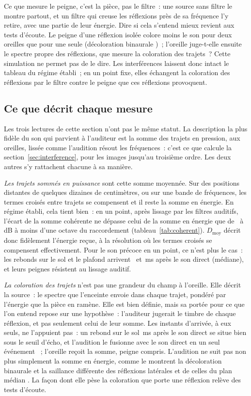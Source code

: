 \documentclass[11pt,a4paper]{article}
\begin{document}
Ce que mesure le peigne, c'est la pièce, pas le filtre~: une source sans filtre le montre partout, et un
filtre qui creuse les réflexions près de sa fréquence l'y retire, avec une partie de leur énergie.
Dire si cela s'entend mieux revient aux tests d'écoute. Le peigne d'une réflexion isolée colore moins
le son pour deux oreilles que pour une seule (décoloration binaurale \cite{salomons1995})~; l'oreille
juge-t-elle ensuite le spectre propre des réflexions, que mesure la coloration des trajets~? Cette
simulation ne permet pas de le dire. Les interférences laissent donc intact le tableau du régime
établi~; en un point fixe, elles échangent la coloration des réflexions par le filtre contre le peigne
que ces réflexions provoquent.

\subsection{Ce que décrit chaque mesure}
\label{sec:measures}

Les trois lectures de cette section n'ont pas le même statut. La description la plus fidèle du son
qui parvient à l'auditeur est la somme des trajets en pression, aux oreilles, lissée comme l'audition
résout les fréquences~: c'est ce que calcule la section~\ref{sec:interference}, pour les images jusqu'au
troisième ordre. Les deux autres s'y rattachent chacune à sa manière.

\emph{Les trajets sommés en puissance} sont cette somme moyennée. Sur des positions distantes de
quelques dizaines de centimètres, ou sur une bande de fréquences, les termes croisés entre trajets se
compensent et il reste la somme en énergie. En régime établi, cela tient bien~: en un point, après
lissage par les filtres auditifs, l'écart de la somme cohérente ne dépasse celui de la somme en énergie
que de \ncohSteadyGainMin\ à \ncohSteadyGainMax\,dB à moins d'une octave du raccordement
(tableau~\ref{tab:coherent}). $D_{\mathrm{moy}}$ décrit donc fidèlement l'énergie reçue, à la résolution où
les termes croisés se compensent effectivement. Pour le son précoce en un point, ce n'est plus le cas~:
les rebonds sur le sol et le plafond arrivent \ndelayFloor\ et \ndelayCeiling\,ms après le son direct
(médiane), et leurs peignes résistent au lissage auditif.

\emph{La coloration des trajets} n'est pas une grandeur du champ à l'oreille. Elle décrit la source~:
le spectre que l'enceinte envoie dans chaque trajet, pondéré par l'énergie que la pièce en ramène. Elle
est bien définie, mais sa portée pour ce que l'on entend repose sur une hypothèse~: l'auditeur jugerait
le timbre de chaque réflexion, et pas seulement celui de leur somme. Les instants d'arrivée, à eux
seuls, ne l'appuient pas~: un rebond sur le sol \ndelayFloor\,ms après le son direct se situe bien sous le
seuil d'écho, et l'audition le fusionne avec le son direct en un seul événement \cite{litovsky1999}~;
l'oreille reçoit la somme, peigne compris. L'audition ne suit pas non plus simplement la somme en
énergie, comme le montrent la décoloration binaurale \cite{salomons1995} et la saillance différente des
réflexions latérales et de celles du plan médian \cite{olive1989,bech1996}. La façon dont elle pèse la
coloration que porte une réflexion relève des tests d'écoute.
\end{document}
